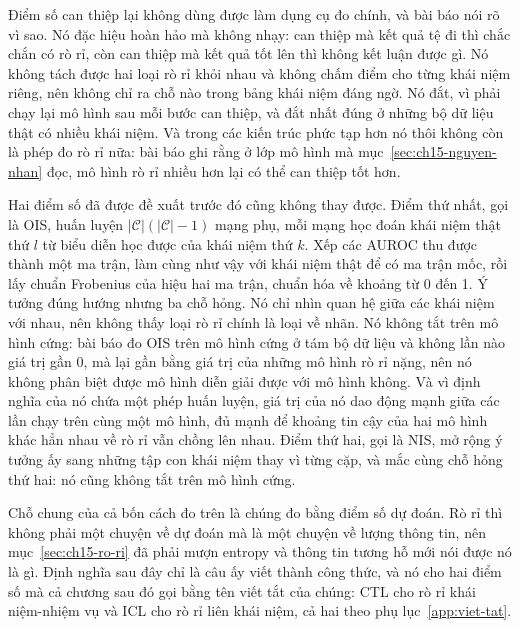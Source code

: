 %
Điểm số can thiệp lại không dùng được làm dụng cụ đo chính, và bài báo nói rõ vì
sao. Nó đặc hiệu hoàn hảo mà không nhạy: can thiệp mà kết quả tệ
đi thì chắc chắn có rò rỉ, còn can thiệp mà kết quả tốt lên thì không kết luận
được gì. Nó không tách được hai loại rò rỉ khỏi nhau và không chấm điểm cho từng
khái niệm riêng, nên không chỉ ra chỗ nào trong bảng khái niệm đáng ngờ. Nó đắt,
vì phải chạy lại mô hình sau mỗi bước can thiệp, và đắt nhất đúng ở những bộ dữ
liệu thật có nhiều khái niệm. Và trong các kiến trúc phức tạp hơn nó thôi không
còn là phép đo rò rỉ nữa: bài báo ghi rằng ở lớp mô hình mà
mục~\ref{sec:ch15-nguyen-nhan} đọc, mô hình rò rỉ nhiều hơn lại có thể can thiệp
tốt hơn.

%
Hai điểm số đã được đề xuất trước đó cũng không thay được. Điểm thứ nhất, gọi là
OIS, huấn luyện $\lvert\mathcal{C}\rvert(\lvert\mathcal{C}\rvert - 1)$ mạng phụ,
mỗi mạng học đoán khái niệm thật thứ $l$ từ biểu diễn học được của khái niệm thứ
$k$. Xếp các AUROC thu được thành một ma trận, làm cùng như vậy với khái niệm thật
để có ma trận mốc, rồi lấy chuẩn Frobenius của hiệu hai ma trận, chuẩn hóa về
khoảng từ 0 đến 1. Ý tưởng đúng hướng nhưng ba chỗ hỏng. Nó chỉ nhìn quan hệ
giữa các khái niệm với nhau, nên không thấy loại rò rỉ chính là loại về nhãn. Nó
không tắt trên mô hình cứng: bài báo đo OIS trên mô hình cứng ở tám bộ dữ liệu
và không lần nào giá trị gần 0, mà lại gần bằng giá trị của những mô hình rò rỉ
nặng, nên nó không phân biệt được mô hình diễn giải được với mô hình không. Và
vì định nghĩa của nó chứa một phép huấn luyện, giá trị của nó dao động mạnh giữa
các lần chạy trên cùng một mô hình, đủ mạnh để khoảng tin cậy của hai mô hình
khác hẳn nhau về rò rỉ vẫn chồng lên nhau. Điểm thứ hai, gọi là NIS, mở rộng ý
tưởng ấy sang những tập con khái niệm thay vì từng cặp, và mắc cùng chỗ hỏng thứ
hai: nó cũng không tắt trên mô hình cứng.

%
Chỗ chung của cả bốn cách đo trên là chúng đo bằng điểm số dự đoán. Rò rỉ thì
không phải một chuyện về dự đoán mà là một chuyện về lượng thông tin, nên
mục~\ref{sec:ch15-ro-ri} đã phải mượn entropy và thông tin tương hỗ mới nói được
nó là gì. Định nghĩa sau đây chỉ là câu ấy viết thành công thức, và nó cho hai
điểm số mà cả chương sau đó gọi bằng tên viết tắt của chúng: CTL cho rò rỉ khái
niệm-nhiệm vụ và ICL cho rò rỉ liên khái niệm, cả hai theo phụ
lục~\ref{app:viet-tat}.

